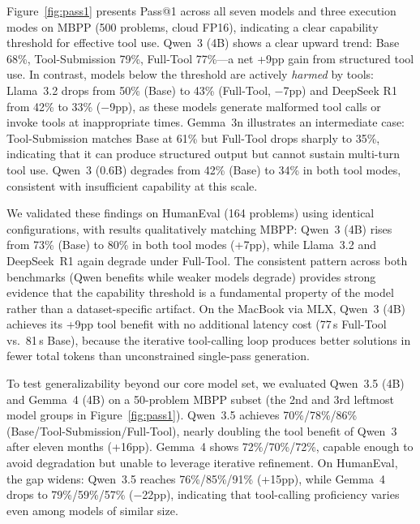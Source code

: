 \documentclass[sigconf,anonymous,review]{acmart}
\begin{document}
Figure~\ref{fig:pass1} presents Pass@1 across all seven models and three execution modes on MBPP (500 problems, cloud FP16), indicating a clear capability threshold for effective tool use. Qwen~3 (4B) shows a clear upward trend: Base 68\%, Tool-Submission 79\%, Full-Tool 77\%---a net +9pp gain from structured tool use. In contrast, models below the threshold are actively \emph{harmed} by tools: Llama~3.2 drops from 50\% (Base) to 43\% (Full-Tool, $-$7pp) and DeepSeek R1 from 42\% to 33\% ($-$9pp), as these models generate malformed tool calls or invoke tools at inappropriate times. Gemma~3n illustrates an intermediate case: Tool-Submission matches Base at 61\% but Full-Tool drops sharply to 35\%, indicating that it can produce structured output but cannot sustain multi-turn tool use. Qwen~3 (0.6B) degrades from 42\% (Base) to 34\% in both tool modes, consistent with insufficient capability at this scale.

We validated these findings on HumanEval (164 problems) using identical configurations, with results qualitatively matching MBPP: Qwen~3 (4B) rises from 73\% (Base) to 80\% in both tool modes (+7pp), while Llama~3.2 and DeepSeek~R1 again degrade under Full-Tool. The consistent pattern across both benchmarks (Qwen benefits while weaker models degrade) provides strong evidence that the capability threshold is a fundamental property of the model rather than a dataset-specific artifact. On the MacBook via MLX, Qwen~3 (4B) achieves its +9pp tool benefit with no additional latency cost (77\,s Full-Tool vs.\ 81\,s Base), because the iterative tool-calling loop produces better solutions in fewer total tokens than unconstrained single-pass generation.

To test generalizability beyond our core model set, we evaluated Qwen~3.5 (4B) and Gemma~4 (4B) on a 50-problem MBPP subset (the 2nd and 3rd leftmost model groups in Figure~\ref{fig:pass1}). Qwen~3.5 achieves 70\%/78\%/86\% (Base/Tool-Submission/Full-Tool), nearly doubling the tool benefit of Qwen~3 after eleven months (+16pp). Gemma~4 shows 72\%/70\%/72\%, capable enough to avoid degradation but unable to leverage iterative refinement. On HumanEval, the gap widens: Qwen~3.5 reaches 76\%/85\%/91\% (+15pp), while Gemma~4 drops to 79\%/59\%/57\% ($-$22pp), indicating that tool-calling proficiency varies even among models of similar size.
\end{document}
